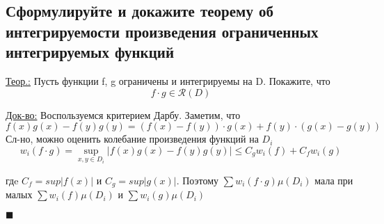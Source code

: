 
\subsection{Сформулируйте и докажите теорему об интегрируемости произведения ограниченных интегрируемых функций}

\underline{Теор.:} 
Пусть функции f, g ограничены и интегрируемы на D. Покажите, что 
    \[f\cdot g\in \mathcal{R}(D)\]

\underline{Док-во:} 
    Воспользуемся критерием Дарбу. Заметим, что \[f(x)g(x) - f(y)g(y) = (f(x) - f(y)) \cdot g(x) + f(y) \cdot (g(x) - g(y))\]
    Сл-но, можно оценить колебание произведения функций на $D_i$
    \[w_i(f \cdot g) = \sup\limits_{x, y \in D_i} |f(x)g(x) - f(y)g(y)| \leq C_g w_i(f) + C_fw_i(g)\]
    
    гдe $C_f = sup|f(x)|$ и $C_g = sup|g(x)|$. Поэтому $\sum w_i(f \cdot g)\mu(D_i)$ мала при малых $\sum w_i(f)\mu(D_i)$ и $\sum w_i(g)\mu(D_i)$
    \begin{flushright}
    $\blacksquare$
    \end{flushright}



